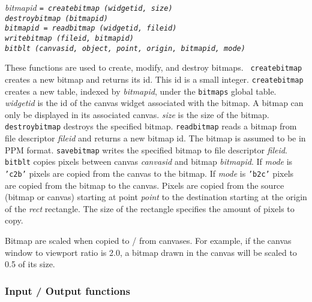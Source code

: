 \begin{flushleft}
\it bitmapid \tt = createbitmap (\it widgetid, size\tt )\\
\tt destroybitmap (\it bitmapid\tt )\\
\it bitmapid \tt = readbitmap (\it widgetid, fileid\tt )\\
\tt writebitmap (\it fileid, bitmapid\tt )\\
\tt bitblt (\it canvasid, object, point, origin, bitmapid, mode\tt )\\
\end{flushleft}\vspace{-2\itemsep}
These functions are used to create, modify, and destroy bitmaps.  {\tt
createbitmap} creates a new bitmap and returns its id. This id is a small
integer. {\tt createbitmap} creates a new table, indexed by {\it bitmapid},
under the {\tt bitmaps} global table. {\it widgetid} is the id of the canvas
widget associated with the bitmap. A bitmap can only be displayed in its
associated canvas. {\it size} is the size of the bitmap.
{\tt destroybitmap} destroys the specified bitmap. {\tt readbitmap}
reads a bitmap from file descriptor {\it fileid} and returns a new bitmap
id. The bitmap is assumed to be in PPM format. {\tt savebitmap} writes
the specified bitmap to file descriptor {\it fileid}. {\tt bitblt} copies
pixels between canvas {\it canvasid} and bitmap {\it bitmapid}. If {\it mode}
is {\tt 'c2b'} pixels are copied from the canvas to the bitmap. If {\it mode}
is {\tt 'b2c'} pixels are copied from the bitmap to the canvas. Pixels
are copied from the source (bitmap or canvas) starting at point {\it point}
to the destination starting at the origin of the {\it rect} rectangle.
The size of the rectangle specifies the amount of pixels to copy.

Bitmap are scaled when copied to / from canvases. For example, if the
canvas window to viewport ratio is 2.0, a bitmap drawn in the canvas will
be scaled to 0.5 of its size.

\subsubsection{Input / Output functions}


